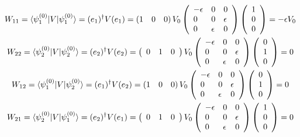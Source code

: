 \documentclass{tstextbook}
\begin{document}
\begin{example}
$$\begin{gather}W_{11}=\langle \psi_{1}^{(0)}|V|\psi_{1}^{(0)} \rangle=(e_{1})^{\dagger}V(e_{1})=\left(1\quad0\quad0\right)V_{0}\left(\begin{array}{l l l}{{-\epsilon}}&{{0}}&{{0}}\\ {{0}}&{{0}}&{{\epsilon}}\\ {{0}}&{{\epsilon}}&{{0}}\end{array}\right)\left(\begin{array}{l}{{1}}\\ {{0}}\\ {{0}}\end{array}\right)=-\epsilon V_{0}\\ W_{22}=\langle \psi_{2}^{(0)}|V|\psi_{2}^{(0)} \rangle=(e_{2})^{\dagger}V(e_{2})=\left(\begin{array}{l l l}{{0}}&{{1}}&{{0}}\end{array}\right)V_{0}\left(\begin{array}{l l l}{{-\epsilon}}&{{0}}&{{0}}\\ {{0}}&{{0}}&{{\epsilon}}\\ {{0}}&{{\epsilon}}&{{0}}\end{array}\right)\left(\begin{array}{l}{{0}}\\ {{1}}\\ {{0}}\end{array}\right)=0\\ W_{12}=\langle \psi_{1}^{(0)}|V|\psi_{2}^{(0)} \rangle=(e_{1})^{\dagger}V(e_{2})=\left(1\quad0\quad0\right)V_{0}\left(\begin{array}{l l l}{{-\epsilon}}&{{0}}&{{0}}\\ {{0}}&{{0}}&{{\epsilon}}\\ {{0}}&{{\epsilon}}&{{0}}\end{array}\right)\left(\begin{array}{l}{{0}}\\ {{1}}\\ {{0}}\end{array}\right)=0\\ W_{21}=\langle \psi_{2}^{(0)}|V|\psi_{1}^{(0)} \rangle=(e_{2})^{\dagger}V(e_{1})=\left(\begin{array}{l l l}{{0}}&{{1}}&{{0}}\end{array}\right)V_{0}\left(\begin{array}{l l l}{{-\epsilon}}&{{0}}&{{0}}\\ {{0}}&{{0}}&{{\epsilon}}\\ {{0}}&{{\epsilon}}&{{0}}\end{array}\right)\left(\begin{array}{l}{{1}}\\ {{0}}\\ {{0}}\end{array}\right)=0

\end{gather}$$
\end{example}
\end{document}
